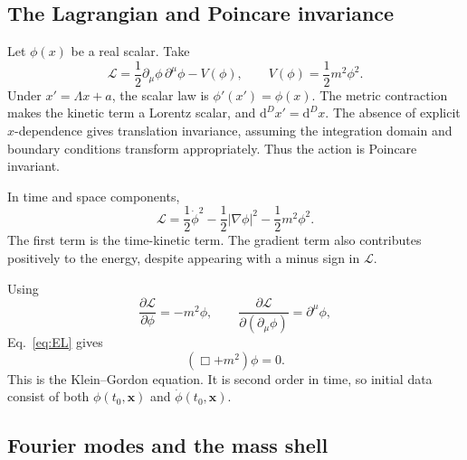 \documentclass[11pt]{article}
\newcommand{\dd}{\mathrm{d}}
\newcommand{\Lag}{\mathcal{L}}
\begin{document}
\subsection{The Lagrangian and Poincare invariance}

Let \(\phi(x)\) be a real scalar. Take
\begin{equation}
\Lag=\frac12\partial_\mu\phi\,\partial^\mu\phi-V(\phi),
\qquad V(\phi)=\frac12m^2\phi^2.
\label{eq:scalarL}
\end{equation}
Under \(x'=\Lambda x+a\), the scalar law is \(\phi'(x')=\phi(x)\).
The metric contraction makes the kinetic term a Lorentz scalar, and
\(\dd^D x'=\dd^D x\). The absence of explicit \(x\)-dependence gives
translation invariance, assuming the integration domain and boundary
conditions transform appropriately. Thus the action is Poincare invariant.

In time and space components,
\begin{equation}
\Lag=\frac12\dot\phi^2-\frac12|\nabla\phi|^2-\frac12m^2\phi^2.
\end{equation}
The first term is the time-kinetic term. The gradient term also contributes
positively to the energy, despite appearing with a minus sign in \(\Lag\).

Using
\begin{equation}
\frac{\partial\Lag}{\partial\phi}=-m^2\phi,
\qquad
\frac{\partial\Lag}{\partial(\partial_\mu\phi)}=\partial^\mu\phi,
\end{equation}
Eq.~\eqref{eq:EL} gives
\begin{equation}
\boxed{(\Box+m^2)\phi=0.}
\label{eq:KG}
\end{equation}
This is the Klein--Gordon equation. It is second order in time, so initial
data consist of both \(\phi(t_0,\bm x)\) and \(\dot\phi(t_0,\bm x)\).

\subsection{Fourier modes and the mass shell}
\end{document}
